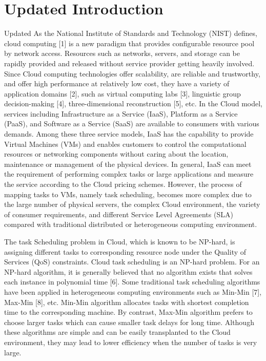 \documentclass[conference]{IEEEtran}%
\begin{document}
\section{Updated Introduction}%
\label{sec:UpdatedIntroduction}%
Updated As the National Institute of Standards and Technology (NIST) defines, cloud computing [1] is a new paradigm that provides configurable resource pool by network access. Resources such as networks, servers, and storage can be rapidly provided and released without service provider getting heavily involved. Since Cloud computing technologies offer scalability, are reliable and trustworthy, and offer high performance at relatively low cost, they have a variety of application domains [2], such as virtual computing labs [3], linguistic group decision-making [4], three-dimensional reconstruction [5], etc. In the Cloud model, services including Infrastructure as a Service (IaaS), Platform as a Service (PaaS), and Software as a Service (SaaS) are available to consumers with various demands. Among these three service models, IaaS has the capability to provide Virtual Machines (VMs) and enables customers to control the computational resources or networking components without caring about the location, maintenance or management of the physical devices. In general, IaaS can meet the requirement of performing complex tasks or large applications and measure the service according to the Cloud pricing schemes. However, the process of mapping tasks to VMs, namely task scheduling, becomes more complex due to the large number of physical servers, the complex Cloud environment, the variety of consumer requirements, and different Service Level Agreements (SLA) compared with traditional distributed or heterogeneous computing environment.

 The task Scheduling problem in Cloud, which is known to be NP-hard, is assigning different tasks to corresponding resource node under the Quality of Services (QoS) constraints. Cloud task scheduling is an NP-hard problem. For an NP-hard algorithm, it is generally believed that no algorithm exists that solves each instance in polynomial time [6]. Some traditional task scheduling algorithms have been applied in heterogeneous computing environments such as Min-Min [7], Max-Min [8], etc. Min-Min algorithm allocates tasks with shortest completion time to the corresponding machine. By contrast, Max-Min algorithm prefers to choose larger tasks which can cause smaller task delays for long time. Although these algorithms are simple and can be easily transplanted to the Cloud environment, they may lead to lower efficiency when the number of tasks is very large.
\end{document}
